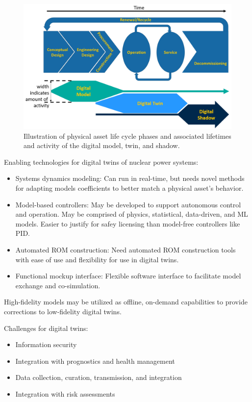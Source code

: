 \documentclass[letterpage,11pt]{article}
\begin{document}
\begin{figure}[htb]
  \centering
  \includegraphics[width=\textwidth]{digital-twin-life-cycle}
  \caption{Illustration of physical asset life cycle phases and associated lifetimes and activity
  of the digital model, twin, and shadow.}
\end{figure}

Enabling technologies for digital twins of nuclear power systems:
%
\begin{itemize}
  \item Systems dynamics modeling: Can run in real-time, but needs novel methods for adapting
    models coefficients to better match a physical asset's behavior.
  \item Model-based controllers: May be developed to support autonomous control and operation.
    May be comprised of physics, statistical, data-driven, and ML models. Easier to justify for
    safey licensing than model-free controllers like PID.
  \item Automated ROM construction: Need automated ROM construction tools with ease of use and
    flexibility for use in digital twins.
  \item Functional mockup interface: Flexible software interface to facilitate model exchange and
    co-simulation.
\end{itemize}

High-fidelity models may be utilized as offline, on-demand capabilities to provide corrections to
low-fidelity digital twins.

Challenges for digital twins:
%
\begin{itemize}
  \item Information security
  \item Integration with prognostics and health management
  \item Data collection, curation, transmission, and integration
  \item Integration with risk assessments
\end{itemize}

\pagebreak


\end{document}
